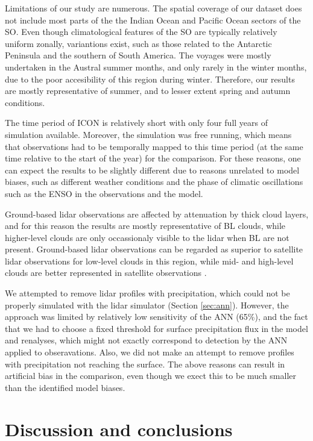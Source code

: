 \documentclass[12pt,a4paper]{article}
\begin{document}
Limitations of our study are numerous. The spatial coverage of our dataset
does not include most parts of the the Indian Ocean and Pacific Ocean sectors
of the SO. Even though climatological features of the SO are typically
relatively uniform zonally, variantions exist, such as those related to the
Antarctic Peninsula and the southern of South America. The voyages were
mostly undertaken in the Austral summer months, and only rarely in the winter
months, due to the poor accesibility of this region during winter. Therefore,
our results are mostly representative of summer, and to lesser extent spring
and autumn conditions.

The time period of ICON is relatively short with only four full years of
simulation available. Moreover, the simulation was free running, which means
that observations had to be temporally mapped to this time period (at the same
time relative to the start of the year) for the comparison. For these reasons,
one can expect the results to be slightly different due to reasons unrelated to
model biases, such as different weather conditions and the phase of climatic
oscillations such as the ENSO in the observations and the model.

Ground-based lidar observations are affected by attenuation by thick cloud
layers, and for this reason the results are mostly representative of BL clouds,
while higher-level clouds are only occassionaly visible to the lidar when BL
are not present. Ground-based lidar observations can be regarded as superior to
satellite lidar observations for low-level clouds in this region, while mid-
and high-level clouds are better represented in satellite observations
\citep{mcerlich2021}.

We attempted to remove lidar profiles with precipitation, which could not be
properly simulated with the lidar simulator (Section \ref{sec:ann}). However,
the approach was limited by relatively low sensitivity of the ANN (65\%), and
the fact that we had to choose a fixed threshold for surface precipitation flux
in the model and renalyses, which might not exactly correspond to detection by
the ANN applied to obseravations. Also, we did not make an attempt to remove
profiles with precipitation not reaching the surface. The above reasons can
result in artificial bias in the comparison, even though we exect this to be
much smaller than the identified model biases.

\section{Discussion and conclusions}
\end{document}
